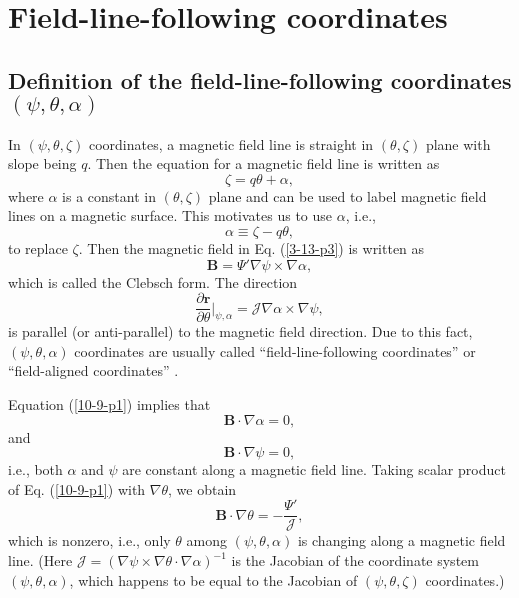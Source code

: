 \documentclass{llncs}
\newcommand{\nobracket}{}
\begin{document}
\section{Field-line-following coordinates}\label{21-10-8-1}

\subsection{Definition of the field-line-following coordinates $(\psi, \theta,
\alpha)$}

In $(\psi, \theta, \zeta)$ coordinates, a magnetic field line is straight in
$(\theta, \zeta)$ plane with slope being $q$. Then the equation for a magnetic
field line is written as
\begin{equation}
  \zeta = q \theta + \alpha,
\end{equation}
where $\alpha$ is a constant in $(\theta, \zeta)$ plane and can be used to
label magnetic field lines on a magnetic surface. This motivates us to use
$\alpha$, i.e.,
\begin{equation}
  \label{17-3-18-1} \alpha \equiv \zeta - q \theta,
\end{equation}
to replace $\zeta$. Then the magnetic field in Eq. (\ref{3-13-p3}) is written
as
\begin{equation}
  \label{10-9-p1} \mathbf{B}= \Psi' \nabla \psi \times \nabla \alpha,
\end{equation}
which is called the Clebsch form. The direction
\begin{equation}
  \frac{\partial \mathbf{r}}{\partial \theta} |_{\psi, \alpha} \nobracket =
  \mathcal{J} \nabla \alpha \times \nabla \psi,
\end{equation}
is parallel (or anti-parallel) to the magnetic field direction. Due to this
fact, $(\psi, \theta, \alpha)$ coordinates are usually called
``field-line-following coordinates'' or ``field-aligned coordinates''
{\cite{beer1995,ychen2003}}.

Equation (\ref{10-9-p1}) implies that
\begin{equation}
  \mathbf{B} \cdot \nabla \alpha = 0,
\end{equation}
and
\begin{equation}
  \mathbf{B} \cdot \nabla \psi = 0,
\end{equation}
i.e., both $\alpha$ and $\psi$ are constant along a magnetic field line.
Taking scalar product of Eq. (\ref{10-9-p1}) with $\nabla \theta$, we obtain
\begin{equation}
  \mathbf{B} \cdot \nabla \theta = - \frac{\Psi'}{\mathcal{J}},
\end{equation}
which is nonzero, i.e., only $\theta$ among $(\psi, \theta, \alpha)$ is
changing along a magnetic field line. (Here $\mathcal{J}= (\nabla \psi \times
\nabla \theta \cdot \nabla \alpha)^{- 1}$ is the Jacobian of the coordinate
system $(\psi, \theta, \alpha)$, which happens to be equal to the Jacobian of
$(\psi, \theta, \zeta)$ coordinates.)
\end{document}

